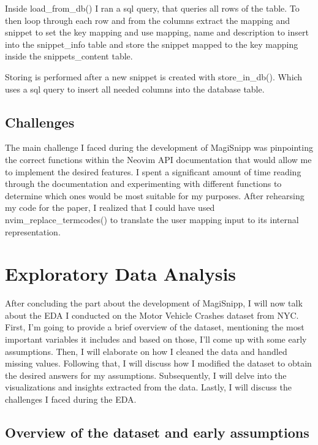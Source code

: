 \documentclass[runningheads]{llncs}
\begin{document}
Inside load\_from\_db() I ran a sql query, that queries all rows of the table. To then loop through each row
and from the columns extract the mapping and snippet to set the key mapping and use mapping, name and description to insert into the snippet\_info table
and store the snippet mapped to the key mapping inside the snippets\_content table.

Storing is performed after a new snippet is created with store\_in\_db().
Which uses a sql query to insert all needed columns into the database table.

\subsection{Challenges}

The main challenge I faced during the development of MagiSnipp was pinpointing the correct functions 
within the Neovim API documentation that would allow me to implement the desired features.
I spent a significant amount of time reading through the documentation and experimenting with different functions 
to determine which ones would be most suitable for my purposes. After rehearsing my code for the paper,
I realized that I could have used nvim\_replace\_termcodes() to translate the user mapping input to its internal representation.

\section{Exploratory Data Analysis}

After concluding the part about the development of MagiSnipp, 
I will now talk about the EDA I conducted on the Motor Vehicle Crashes dataset from NYC. 
First, I'm going to provide a brief overview of the dataset, mentioning the most important 
variables it includes and based on those, I'll come up with some early assumptions. 
Then, I will elaborate on how I cleaned the data and handled missing values. Following that, 
I will discuss how I modified the dataset to obtain the desired answers for my assumptions. 
Subsequently, I will delve into the visualizations and insights extracted from the data. 
Lastly, I will discuss the challenges I faced during the EDA.


\subsection{Overview of the dataset and early assumptions}
\end{document}
